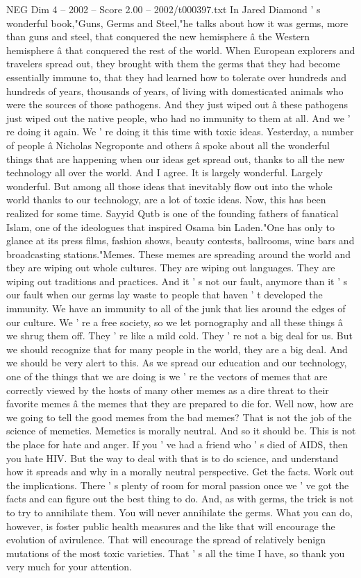 \begin{textsample}{NEG Dim 4 – 2002 – Score 2.00 – 2002/t000397.txt}
In Jared Diamond ' s wonderful book,"Guns, Germs and Steel,"he talks about how it was germs, more than guns and steel, that conquered the new hemisphere â the Western hemisphere â that conquered the rest of the world.
When European explorers and travelers spread out, they brought with them the germs that they had become essentially immune to, that they had learned how to tolerate over hundreds and hundreds of years, thousands of years, of living with domesticated animals who were the sources of those pathogens.
And they just wiped out â these pathogens just wiped out the native people, who had no immunity to them at all.
And we ' re doing it again.
We ' re doing it this time with toxic ideas.
Yesterday, a number of people â Nicholas Negroponte and others â spoke about all the wonderful things that are happening when our ideas get spread out, thanks to all the new technology all over the world.
And I agree.
It is largely wonderful.
Largely wonderful.
But among all those ideas that inevitably flow out into the whole world thanks to our technology, are a lot of toxic ideas.
Now, this has been realized for some time.
Sayyid Qutb is one of the founding fathers of fanatical Islam, one of the ideologues that inspired Osama bin Laden."One has only to glance at its press films, fashion shows, beauty contests, ballrooms, wine bars and broadcasting stations."Memes.
These memes are spreading around the world and they are wiping out whole cultures.
They are wiping out languages.
They are wiping out traditions and practices.
And it ' s not our fault, anymore than it ' s our fault when our germs lay waste to people that haven ' t developed the immunity.
We have an immunity to all of the junk that lies around the edges of our culture.
We ' re a free society, so we let pornography and all these things â we shrug them off.
They ' re like a mild cold.
They ' re not a big deal for us.
But we should recognize that for many people in the world, they are a big deal.
And we should be very alert to this.
As we spread our education and our technology, one of the things that we are doing is we ' re the vectors of memes that are correctly viewed by the hosts of many other memes as a dire threat to their favorite memes â the memes that they are prepared to die for.
Well now, how are we going to tell the good memes from the bad memes?
That is not the job of the science of memetics.
Memetics is morally neutral.
And so it should be.
This is not the place for hate and anger.
If you ' ve had a friend who ' s died of AIDS, then you hate HIV.
But the way to deal with that is to do science, and understand how it spreads and why in a morally neutral perspective.
Get the facts.
Work out the implications.
There ' s plenty of room for moral passion once we ' ve got the facts and can figure out the best thing to do.
And, as with germs, the trick is not to try to annihilate them.
You will never annihilate the germs.
What you can do, however, is foster public health measures and the like that will encourage the evolution of avirulence.
That will encourage the spread of relatively benign mutations of the most toxic varieties.
That ' s all the time I have, so thank you very much for your attention.

\end{textsample}
